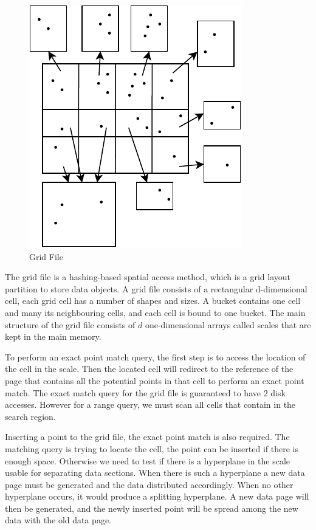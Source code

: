 \begin{figure}[ht]
\centering
\includegraphics[scale=0.75]{Figures/grid_file.pdf}
\caption{Grid File}
\label{fig:grid_file}
\end{figure}

The grid file \cite{NievergeltJ:1984kc} is a hashing-based spatial access method, which is a grid layout partition to store data objects. A grid file consists of a rectangular d-dimensional cell, each grid cell has a number of shapes and sizes. A bucket contains one cell and many its neighbouring cells, and each cell is bound to one bucket. The main structure of the grid file consists of $d$ one-dimensional arrays called scales that are kept in the main memory. 


To perform an exact point match query, the first step is to access the location of the cell in the scale. Then the located cell will redirect to the reference of the page that contains all the potential points in that cell to perform an exact point match. The exact match query for the grid file is guaranteed to have 2 disk accesses. However for a range query, we must scan all cells that contain in the search region. 

Inserting a point to the grid file, the exact point match is also required. The matching query is trying to locate the cell, the point can be inserted if there is enough space. Otherwise we need to test if there is a hyperplane in the scale usable for separating data sections. When there is such a hyperplane a new data page must be generated and the data distributed accordingly. When no other hyperplane occurs, it would produce a splitting hyperplane. A new data page will then be generated, and the newly inserted point will be spread among the new data with the old data page. 



